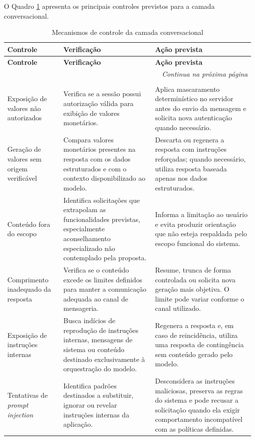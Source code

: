 O Quadro \ref{quad:guardrails_ia} apresenta os principais controles previstos para a camada conversacional.

{\small
\begin{longtable}{|p{3.7cm}|p{5.2cm}|p{5.4cm}|}
\caption{Mecanismos de controle da camada conversacional}
\label{quad:guardrails_ia} \\
\hline
\textbf{Controle} & \textbf{Verificação} & \textbf{Ação prevista} \\ \hline
\endfirsthead
\hline
\textbf{Controle} & \textbf{Verificação} & \textbf{Ação prevista} \\ \hline
\endhead
\hline
\multicolumn{3}{r}{\fontsize{10pt}{10pt}\selectfont\textit{Continua na próxima página}} \\
\endfoot
\hline
\multicolumn{3}{c}{\fontsize{10pt}{10pt}\selectfont \textbf{Fonte:} Elaborado pelos autores (2026).} \\
\endlastfoot

Exposição de valores não autorizados &
Verifica se a sessão possui autorização válida para exibição de valores monetários. &
Aplica mascaramento determinístico no servidor antes do envio da mensagem e solicita nova autenticação quando necessário.
\\ \hline

Geração de valores sem origem verificável &
Compara valores monetários presentes na resposta com os dados estruturados e com o contexto disponibilizado ao modelo. &
Descarta ou regenera a resposta com instruções reforçadas; quando necessário, utiliza resposta baseada apenas nos dados estruturados.
\\ \hline

Conteúdo fora do escopo &
Identifica solicitações que extrapolam as funcionalidades previstas, especialmente aconselhamento especializado não contemplado pela proposta. &
Informa a limitação ao usuário e evita produzir orientação que não esteja respaldada pelo escopo funcional do sistema.
\\ \hline

Comprimento inadequado da resposta &
Verifica se o conteúdo excede os limites definidos para manter a comunicação adequada ao canal de mensageria. &
Resume, trunca de forma controlada ou solicita nova geração mais objetiva. O limite pode variar conforme o canal utilizado.
\\ \hline

Exposição de instruções internas &
Busca indícios de reprodução de instruções internas, mensagens de sistema ou conteúdo destinado exclusivamente à orquestração do modelo. &
Regenera a resposta e, em caso de reincidência, utiliza uma resposta de contingência sem conteúdo gerado pelo modelo.
\\ \hline

Tentativas de \textit{prompt injection} &
Identifica padrões destinados a substituir, ignorar ou revelar instruções internas da aplicação. &
Desconsidera as instruções maliciosas, preserva as regras do sistema e pode recusar a solicitação quando ela exigir comportamento incompatível com as políticas definidas.
\\ \hline

\end{longtable}
}

